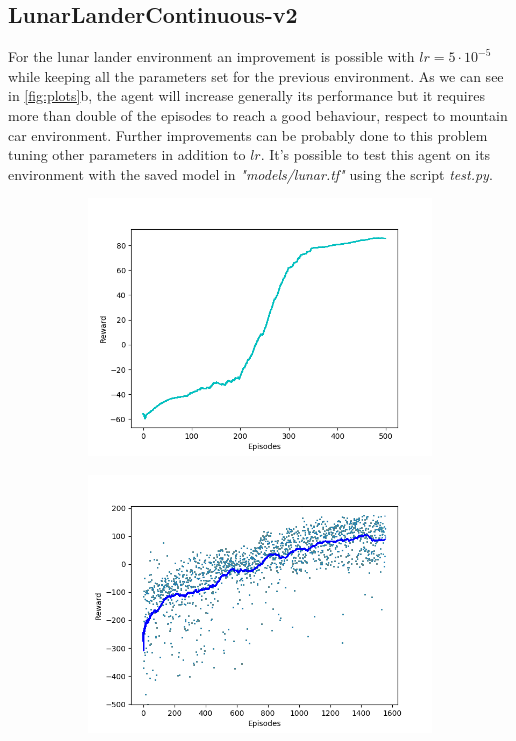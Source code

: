 \documentclass[11pt]{article}
\begin{document}
\subsection{LunarLanderContinuous-v2}
For the lunar lander environment an improvement is possible with $lr = 5 \cdot 10^{-5}$ while
keeping all the parameters set for the previous environment. As we can see in
\ref{fig:plots}b, the agent will increase generally its performance but it requires more
than double of the episodes to reach a good behaviour, respect to mountain car environment. Further improvements
can be probably done to this problem tuning other parameters in addition to $lr$. It's possible to
test this agent on its environment with the saved model in \textit{"models/lunar.tf"}
using the script \textit{test.py}.

\begin{figure}[h!]
        \centering
        \begin{subfigure}[b]{0.7\linewidth}
                \includegraphics[width=\linewidth]{mountain_plot}
                \caption{}
        \end{subfigure}
        \begin{subfigure}[b]{0.7\linewidth}
                \includegraphics[width=\linewidth]{lunar_plot}
                \caption{}
        \end{subfigure}


\end{figure}
\end{document}
